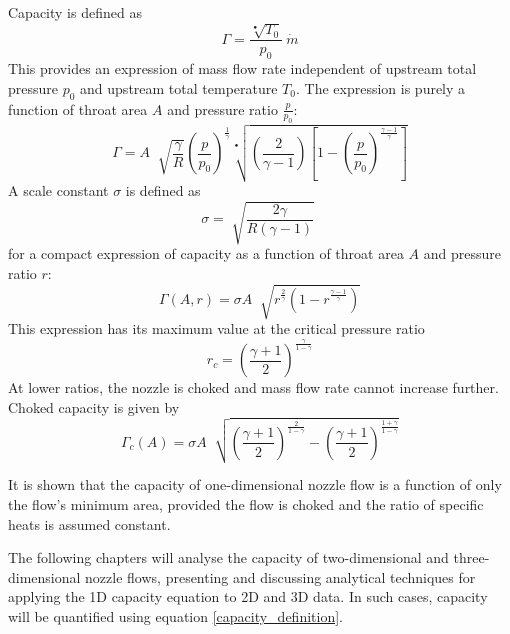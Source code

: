 \documentclass[11pt, twoside]{report}
\begin{document}
Capacity is defined as
\begin{equation}\label{capacity_definition}
\Gamma = \frac{\sqrt[•]{T_0}}{p_0}  \>
\dot{m}
\end{equation}
This provides an expression of mass flow rate independent of upstream total pressure $p_0$ and upstream total temperature $T_0$. The expression is purely a function of throat area $A$ and pressure ratio $\frac{p}{p_0}$:
\begin{equation}
\Gamma =
A \;
\sqrt[]{\frac{\gamma}{R}}
\left(
    \frac{p}{p_0}
\right)^\frac{1}{\gamma}
\sqrt[•]{
	\left(
		\frac{2}{\gamma - 1}  
	\right)
	\left[
		1 - \left( \frac{p}{p_0} \right)^\frac{\gamma-1}{\gamma}
	\right] 
}
\end{equation}
A scale constant $\sigma$ is defined as
\begin{equation}
\sigma = 
\sqrt[]{\frac{2\gamma}{R\left(\gamma-1\right)}} \;
\end{equation}
for a compact expression of capacity as a function of throat area $A$ and pressure ratio $r$:
\begin{equation}
\Gamma \left( A, r \right) = 
\sigma
A \;
\sqrt[]{
	r^\frac{2}{\gamma}
	\left(
		1 - r ^\frac{\gamma-1}{\gamma}
	\right) 
}
\end{equation}
This expression has its maximum value at the critical pressure ratio
\begin{equation}
r_c =
\left(
	\frac{\gamma+1}{2}
\right)
^\frac{\gamma}{1-\gamma}
\end{equation}
At lower ratios, the nozzle is choked and mass flow rate cannot increase further. Choked capacity is given by
\begin{equation}\label{choked_capacity_from_area}
\Gamma_c \left( A \right) =
\sigma
A \;
\sqrt[]{
	\left(
		\frac{\gamma + 1}{2}  
	\right)
	^\frac{2}{1-\gamma}
	-
	\left(
		\frac{\gamma + 1}{2}  
	\right)
	^\frac{1+\gamma}{1-\gamma}
}
\end{equation}

It is shown that the capacity of one-dimensional nozzle flow is a function of only the flow's minimum area, provided the flow is choked and the ratio of specific heats is assumed constant. 

The following chapters will analyse the capacity of two-dimensional and three-dimensional nozzle flows, presenting and discussing analytical techniques for applying the 1D capacity equation to 2D and 3D data. In such cases, capacity will be quantified using equation \ref{capacity_definition}.
\end{document}
